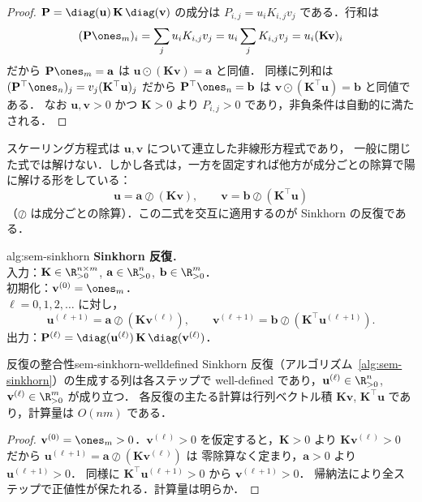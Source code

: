 \begin{proof}
  $\mathbf{P} = \diag(\mathbf{u})\,\mathbf{K}\,\diag(\mathbf{v})$ の成分は
  $P_{i,j} = u_i K_{i,j} v_j$ である．行和は
  \[
    (\mathbf{P}\ones_m)_i
    = \sum_j u_i K_{i,j} v_j
    = u_i \sum_j K_{i,j} v_j
    = u_i (\mathbf{K}\mathbf{v})_i
  \]
  だから $\mathbf{P}\ones_m = \mathbf{a}$ は $\mathbf{u}\odot(\mathbf{K}\mathbf{v}) = \mathbf{a}$ と同値．
  同様に列和は $(\mathbf{P}^\top\ones_n)_j = v_j(\mathbf{K}^\top\mathbf{u})_j$ だから
  $\mathbf{P}^\top\ones_n = \mathbf{b}$ は $\mathbf{v}\odot(\mathbf{K}^\top\mathbf{u}) = \mathbf{b}$ と同値である．
  なお $\mathbf{u}, \mathbf{v} > 0$ かつ $\mathbf{K} > 0$ より $P_{i,j} > 0$ であり，非負条件は自動的に満たされる．
\end{proof}

スケーリング方程式は $\mathbf{u}, \mathbf{v}$ について連立した非線形方程式であり，
一般に閉じた式では解けない．しかし各式は，一方を固定すれば他方が成分ごとの除算で陽に解ける形をしている：
\[
  \mathbf{u} = \mathbf{a} \oslash (\mathbf{K}\mathbf{v}),
  \qquad
  \mathbf{v} = \mathbf{b} \oslash (\mathbf{K}^\top\mathbf{u})
\]
（$\oslash$ は成分ごとの除算）．この二式を交互に適用するのが Sinkhorn の反復である．

\begin{algorithm}{alg:sem-sinkhorn}
  \textbf{Sinkhorn 反復}．\\
  入力：$\mathbf{K} \in \R_{>0}^{n\times m}$, $\mathbf{a} \in \R_{>0}^n$, $\mathbf{b} \in \R_{>0}^m$．\\
  初期化：$\mathbf{v}^{(0)} = \ones_m$．\\
  $\ell = 0, 1, 2, \ldots$ に対し，
  \[
    \mathbf{u}^{(\ell+1)} = \mathbf{a} \oslash (\mathbf{K}\mathbf{v}^{(\ell)}),
    \qquad
    \mathbf{v}^{(\ell+1)} = \mathbf{b} \oslash (\mathbf{K}^\top\mathbf{u}^{(\ell+1)}).
  \]
  出力：$\mathbf{P}^{(\ell)} = \diag(\mathbf{u}^{(\ell)})\,\mathbf{K}\,\diag(\mathbf{v}^{(\ell)})$．
\end{algorithm}

\begin{proposition}{反復の整合性}{sem-sinkhorn-welldefined}
  Sinkhorn 反復（アルゴリズム~\ref{alg:sem-sinkhorn}）の生成する列は各ステップで
  well-defined であり，$\mathbf{u}^{(\ell)} \in \R_{>0}^n$, $\mathbf{v}^{(\ell)} \in \R_{>0}^m$ が成り立つ．
  各反復の主たる計算は行列ベクトル積 $\mathbf{K}\mathbf{v}$, $\mathbf{K}^\top\mathbf{u}$ であり，計算量は $O(nm)$ である．
\end{proposition}

\begin{proof}
  $\mathbf{v}^{(0)} = \ones_m > 0$．$\mathbf{v}^{(\ell)} > 0$ を仮定すると，$\mathbf{K} > 0$ より
  $\mathbf{K}\mathbf{v}^{(\ell)} > 0$ だから $\mathbf{u}^{(\ell+1)} = \mathbf{a}\oslash(\mathbf{K}\mathbf{v}^{(\ell)})$ は
  零除算なく定まり，$\mathbf{a} > 0$ より $\mathbf{u}^{(\ell+1)} > 0$．
  同様に $\mathbf{K}^\top\mathbf{u}^{(\ell+1)} > 0$ から $\mathbf{v}^{(\ell+1)} > 0$．
  帰納法により全ステップで正値性が保たれる．計算量は明らか．
\end{proof}

